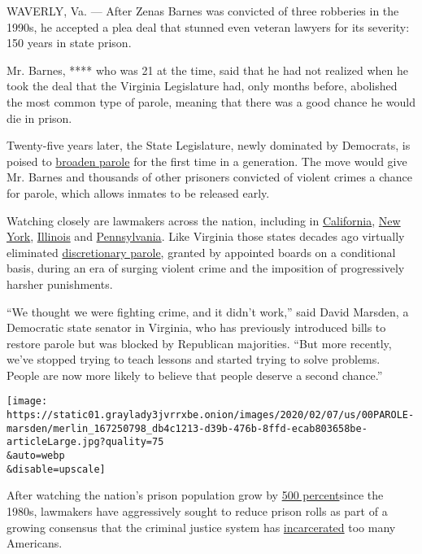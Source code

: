 WAVERLY, Va. --- After Zenas Barnes was convicted of three robberies in
the 1990s, he accepted a plea deal that stunned even veteran lawyers for
its severity: 150 years in state prison.

Mr. Barnes, **** who was 21 at the time, said that he had not realized
when he took the deal that the Virginia Legislature had, only months
before, abolished the most common type of parole, meaning that there was
a good chance he would die in prison.

Twenty-five years later, the State Legislature, newly dominated by
Democrats, is poised to
\href{http://lis.virginia.gov/cgi-bin/legp604.exe?201+doc+S0310203}{broaden
parole} for the first time in a generation. The move would give Mr.
Barnes and thousands of other prisoners convicted of violent crimes a
chance for parole, which allows inmates to be released early.

Watching closely are lawmakers across the nation, including in
\href{https://www-cdn.law.stanford.edu/wp-content/uploads/2015/07/Final-FSR-Published-Article-1.pdf}{California},
\href{https://www.nysenate.gov/legislation/bills/2019/s497}{New York},
\href{http://www.illinoissenatedemocrats.com/sen-harmon-home/7182-new-harmon-law-creates-parole-option-for-youthful-offenders}{Illinois}
and
\href{https://www.inquirer.com/news/probation-parole-philadelphia-prison-mass-incarceration-violations-corrections-secretary-john-wetzel-20190618.html}{Pennsylvania}.
Like Virginia those states decades ago virtually eliminated
\href{https://www-cdn.law.stanford.edu/wp-content/uploads/2016/01/Rhine-Petersilia-Reitz-Improving-Parole-Release-in-America.pdf}{discretionary
parole}, granted by appointed boards on a conditional basis, during an
era of surging violent crime and the imposition of progressively harsher
punishments.

``We thought we were fighting crime, and it didn't work,'' said David
Marsden, a Democratic state senator in Virginia, who has previously
introduced bills to restore parole but was blocked by Republican
majorities. ``But more recently, we've stopped trying to teach lessons
and started trying to solve problems. People are now more likely to
believe that people deserve a second chance.''

\texttt{[image: https://static01.graylady3jvrrxbe.onion/images/2020/02/07/us/00PAROLE-marsden/merlin\_167250798\_db4c1213-d39b-476b-8ffd-ecab803658be-articleLarge.jpg?quality=75\\\&auto=webp\\\&disable=upscale]}

After watching the nation's prison population grow by
\href{https://sentencingproject.org/wp-content/uploads/2016/01/Trends-in-US-Corrections.pdf}{500
percent}since the 1980s, lawmakers have aggressively sought to reduce
prison rolls as part of a growing consensus that the criminal justice
system has
\href{https://sentencingproject.org/wp-content/uploads/2016/01/Trends-in-US-Corrections.pdf}{incarcerated}
too many Americans.

